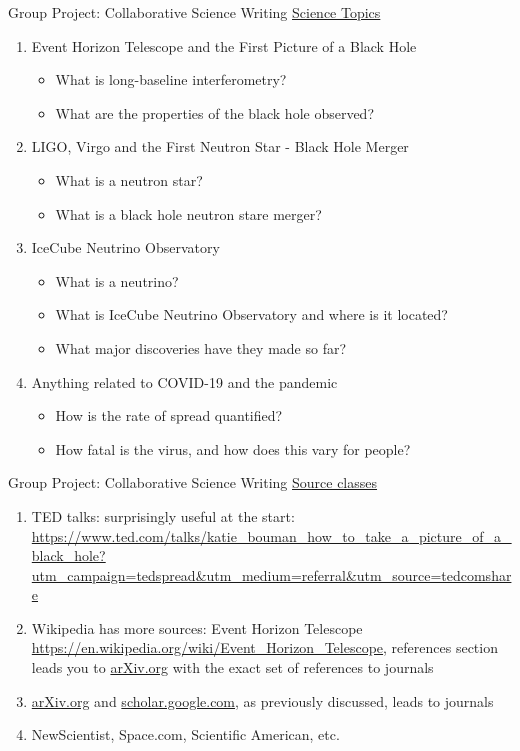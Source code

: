 \documentclass{beamer}
\begin{document}
\begin{frame}{Group Project: Collaborative Science Writing}
\small
\underline{Science Topics}
\begin{enumerate}
\item Event Horizon Telescope and the First Picture of a Black Hole
\begin{itemize}
\item What is long-baseline interferometry?
\item What are the properties of the black hole observed?
\end{itemize}
\item LIGO, Virgo and the First Neutron Star - Black Hole Merger
\begin{itemize}
\item What is a neutron star?
\item What is a black hole neutron stare merger?
\end{itemize}
\item IceCube Neutrino Observatory
\begin{itemize}
\item What is a neutrino?
\item What is IceCube Neutrino Observatory and where is it located?
\item What major discoveries have they made so far?
\end{itemize}
\item Anything related to COVID-19 and the pandemic
\begin{itemize}
\item How is the rate of spread quantified?
\item How fatal is the virus, and how does this vary for people?
\end{itemize}
\end{enumerate}
\end{frame}

\begin{frame}{Group Project: Collaborative Science Writing}
\small
\underline{Source classes}
\begin{enumerate}
\item TED talks: surprisingly useful at the start: \url{https://www.ted.com/talks/katie_bouman_how_to_take_a_picture_of_a_black_hole?utm_campaign=tedspread&utm_medium=referral&utm_source=tedcomshare}
\item Wikipedia has more sources: Event Horizon Telescope \url{https://en.wikipedia.org/wiki/Event_Horizon_Telescope}, references section leads you to \url{arXiv.org} with the exact set of references to journals
\item \url{arXiv.org} and \url{scholar.google.com}, as previously discussed, leads to journals
\item NewScientist, Space.com, Scientific American, etc.
\end{enumerate}
\end{frame}
\end{document}
